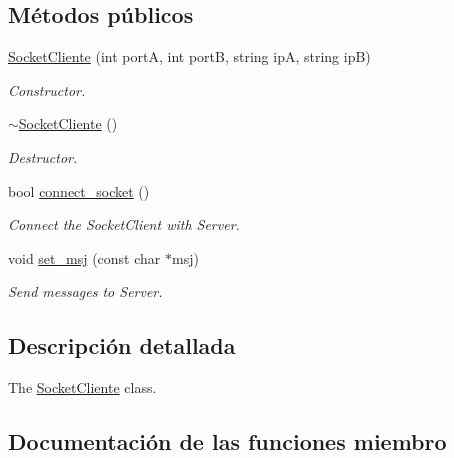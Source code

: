 \subsection*{Métodos públicos}
\begin{DoxyCompactItemize}
\item 
\hyperlink{classSocketCliente_aad9035a6cc6339a73bc1683357ad5260}{Socket\+Cliente} (int portA, int portB, string ipA, string ipB)\hypertarget{classSocketCliente_aad9035a6cc6339a73bc1683357ad5260}{}\label{classSocketCliente_aad9035a6cc6339a73bc1683357ad5260}

\begin{DoxyCompactList}\small\item\em Constructor. \end{DoxyCompactList}\item 
\hyperlink{classSocketCliente_a824901a5f9a1255960fc0ffcc10be678}{$\sim$\+Socket\+Cliente} ()\hypertarget{classSocketCliente_a824901a5f9a1255960fc0ffcc10be678}{}\label{classSocketCliente_a824901a5f9a1255960fc0ffcc10be678}

\begin{DoxyCompactList}\small\item\em Destructor. \end{DoxyCompactList}\item 
bool \hyperlink{classSocketCliente_a61f809a0f5f4f3aeca6f3114056183f8}{connect\+\_\+socket} ()
\begin{DoxyCompactList}\small\item\em Connect the Socket\+Client with Server. \end{DoxyCompactList}\item 
void \hyperlink{classSocketCliente_ae041582d856886a8e0a168a26aab27bd}{set\+\_\+msj} (const char $\ast$msj)
\begin{DoxyCompactList}\small\item\em Send messages to Server. \end{DoxyCompactList}\end{DoxyCompactItemize}


\subsection{Descripción detallada}
The \hyperlink{classSocketCliente}{Socket\+Cliente} class. 

\subsection{Documentación de las funciones miembro}
